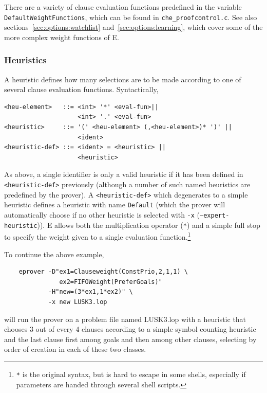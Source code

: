 \documentclass{report}
\begin{document}
There are a variety of clause evaluation functions predefined in
the variable \texttt{DefaultWeightFunctions}, which can be found in
\texttt{che\_proofcontrol.c}. See also
sections~\ref{sec:options:watchlist} and~\ref{sec:options:learning},
which cover some of the more complex weight functions of E.


\subsubsection{Heuristics}

A heuristic defines how many selections are to be made according to
one of several clause evaluation functions. Syntactically,

\begin{verbatim}
<heu-element>   ::= <int> '*' <eval-fun>||
                    <int> '.' <eval-fun>
<heuristic>     ::= '(' <heu-element> (,<heu-element>)* ')' ||
                    <ident>
<heuristic-def> ::= <ident> = <heuristic> ||
                    <heuristic>
\end{verbatim}

As above, a single identifier is only a valid heuristic if it has been
defined in \texttt{<heuristic-def>} previously (although a number of
such named heuristics are predefined by the prover). A
\texttt{<heuristic-def>} which degenerates to a simple heuristic
defines a heuristic with name \texttt{Default} (which the prover will
automatically choose if no other heuristic is selected with
\texttt{-x} (\texttt{--expert-heuristic})). E allows both the
multiplication operator (\texttt{*}) and a simple full stop to specify
the weight given to a single evaluation function.\footnote{\texttt{*}
  is the original syntax, but is hard to escape in some shells,
  especially if parameters are handed through several shell scripts.}

\begin{example}
  To continue the above example,
\begin{verbatim}
    eprover -D"ex1=Clauseweight(ConstPrio,2,1,1) \
               ex2=FIFOWeight(PreferGoals)"
            -H"new=(3*ex1,1*ex2)" \
            -x new LUSK3.lop
\end{verbatim}
  will run the prover on a problem file named LUSK3.lop with a
  heuristic that chooses 3 out of every 4 clauses according to a
  simple symbol counting heuristic and the last clause first among
  goals and then among other clauses, selecting by order of creation
  in each of these two classes.
\end{example}
\end{document}

